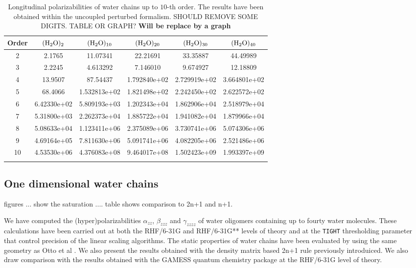 \documentclass[prl,aps,twocolumn,showpacs,twocolumngrid,superbib]{revtex4}
\begin{document}
\begin{table}[t]
  \centering
  \caption{\protect
    Longitudinal polarizabilities of water chains up to $10$-th order.
    The results have been obtained within the uncoupled perturbed formalism.
    SHOULD REMOVE SOME DIGITS. TABLE OR GRAPH? {\bf Will be replace by a graph}
   }\label{tab:UCPHF_1D_h2o}
  \begin{tabular}{cccccc}
    \toprule
    Order 
          & $\rm (H_2O)_2$
          & $\rm (H_2O)_{10}$
          & $\rm (H_2O)_{20}$
          & $\rm (H_2O)_{30}$
          & $\rm (H_2O)_{40}$ \\
    \hline 
    2 & 2.1765      & 11.07341      & 22.21691     & 33.35887     & 44.49989    \\
    3 & 2.2245      & 4.613292      & 7.146010     & 9.674927     & 12.18809    \\
    4 & 13.9507     & 87.54437      & 1.792840e+02 & 2.729919e+02 & 3.664801e+02\\
    5 & 68.4066     & 1.532813e+02  & 1.821498e+02 & 2.242450e+02 & 2.622572e+02\\
    6 & 6.42330e+02 & 5.809193e+03  & 1.202343e+04 & 1.862906e+04 & 2.518979e+04\\
    7 & 5.31800e+03 & 2.262373e+04  & 1.885722e+04 & 1.941082e+04 & 1.879966e+04\\
    8 & 5.08633e+04 & 1.123411e+06  & 2.375089e+06 & 3.730741e+06 & 5.074306e+06\\
    9 & 4.69164e+05 & 7.811630e+06  & 5.091741e+06 & 4.082205e+06 & 2.521486e+06\\
   10 & 4.53530e+06 & 4.376083e+08  & 9.464017e+08 & 1.502423e+09 & 1.993397e+09\\
    \botrule
  \end{tabular}
\end{table}


\subsection{One dimensional water chains}
figures ... show the saturation ....
table shows comparison to 2n+1 and n+1.

We have computed the (hyper)polarizabilities $\alpha_{zz}$, 
$\beta_{zzz}$ and $\gamma_{zzzz}$ of water oligomers containing
up to fourty water molecules. These calculations have been carried out at
both the RHF/6-31G and RHF/6-31G** levels of
theory and at the {\tt TIGHT} thresholding parameter 
that control precision of the linear scaling algorithms.
The static properties of water chains have been evaluated
by using the same geometry as Otto et al \cite{POtto00}. We also
present the results obtained with the density matrix based 2n+1 rule 
previously introduiced.
We also draw comparison with the results obtained with the GAMESS 
quantum chemistry package \cite{gamess} at the RHF/6-31G level of theory.
\end{document}
